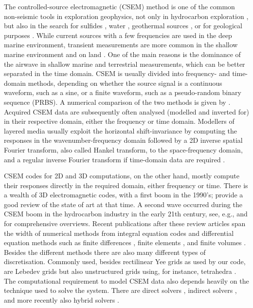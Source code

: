\documentclass[extra, camera,%
    onecolumn,   %
    referee,     %
]{gji}
\begin{document}


The controlled-source electromagnetic (CSEM) method is one of the common
non-seismic tools in exploration geophysics, not only in hydrocarbon
exploration \citep{GEO.10.Constable}, but also in the search for sulfides
\citep{GRL.19.Gehrmann}, water \citep{GEO.05.Pedersen}, geothermal sources
\citep{WGC.15.Girard}, or for geological purposes \citep{NAT.19.Johanson}.
While current sources with a few frequencies are used in the deep marine
environment, transient measurements are more common in the shallow marine
environment and on land \citep[e.g., ][]{GEO.07.Ziolkowski, SEG.07.Andreis,
SEG.07.Avdeeva}. One of the main reasons is the dominance of the airwave in
shallow marine and terrestrial measurements, which can be better separated in
the time domain. CSEM is usually divided into frequency- and time-domain
methods, depending on whether the source signal is a continuous waveform, such
as a sine, or a finite waveform, such as a pseudo-random binary sequence
(PRBS). A numerical comparison of the two methods is given by
\cite{GP.13.Conell}. Acquired CSEM data are subsequently often analysed
(modelled and inverted for) in their respective domain, either the frequency or
time domain. Modellers of layered media usually exploit the horizontal
shift-invariance by computing the responses in the wavenumber-frequency domain
followed by a 2D inverse spatial Fourier transform, also called Hankel
transform, to the space-frequency domain, and a regular inverse Fourier
transform if time-domain data are required \citep[e.g., ][]{GEO.15.Hunziker}.

CSEM codes for 2D and 3D computations, on the other hand, mostly compute their
responses directly in the required domain, either frequency or time. There is a
wealth of 3D electromagnetic codes, with a first boom in the 1990's;
\cite{B.SEG.99.Oristaglio} provide a good review of the state of art at that
time. A second wave occurred during the CSEM boom in the hydrocarbon industry
in the early 21th century, see, e.g., \cite{SG.05.Avdeev} and
\cite{SG.10.Borner} for comprehensive overviews. Recent publications after
these review articles span the width of numerical methods from integral
equation codes \citep{MGS.17.Kruglyakov} and differential equation methods such
as finite differences \citep{GEO.10.Mittet, GEO.11.Zaslavsky, CAG.13.Sommer},
finite elements \citep{GJI.13.Grayver}, and finite volumes
\citep{GEO.14.Jahandari}. Besides the different methods there are also many
different types of discretisation. Commonly used, besides rectilinear Yee grids
\citep{IEEE.66.Yee} as used by our code, are Lebedev grids
\citep{CMMP.64.Lebedev} but also unstructured grids using, for instance,
tetrahedra \citep{CAG.17.Cai}. The computational requirement to model CSEM data
also depends heavily on the technique used to solve the system. There are
direct solvers \citep{GEO.15.Grayver}, indirect solvers
\citep{GJI.15.Jaysaval}, and more recently also hybrid solvers
\citep{GEO.18.Liu}.
\end{document}

